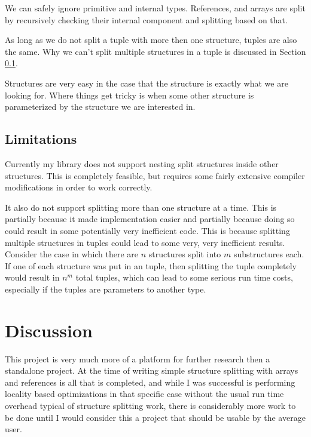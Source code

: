 \documentclass[12pt,final]{article}
\begin{document}
We can safely ignore primitive and internal types. References, and
arrays are split by recursively checking their internal component and splitting
based on that.

As long as we do not split a tuple with more then one structure, tuples are
also the same. Why we can't split multiple structures in a tuple is discussed in
Section \ref{sec:limits}.

Structures are very easy in the case that the structure is exactly what we are
looking for. Where things get tricky is when some other structure is
parameterized by the structure we are interested in. 



\subsection{Limitations}
\label{sec:limits}
Currently my library does not support nesting split structures inside other structures.
This is completely feasible, but requires some fairly extensive compiler
modifications in order to work correctly. 


It also do not support splitting more than one structure at a time. This is
partially because it made implementation easier and partially because doing so
could result in some potentially very inefficient code. This is because
splitting multiple structures in tuples could lead to some very, very
inefficient results. Consider the case in which there are $n$ structures split
into $m$ substructures each. If one of each structure was put in an tuple, then
splitting the tuple completely would result in $n^m$ total tuples, which can lead
to some serious run time costs, especially if the tuples are parameters to
another type.

\section{Discussion}
\label{sec:discuss}

This project is very much more of a platform for further research then a
standalone project. At the time of writing simple structure splitting
with arrays and references is all that is completed, and 
while I was successful is performing locality based
optimizations in that specific case without the usual run time overhead typical of structure splitting
work, there is considerably more work to be done until I would consider this
a project that should be usable by the average user.
\end{document}
